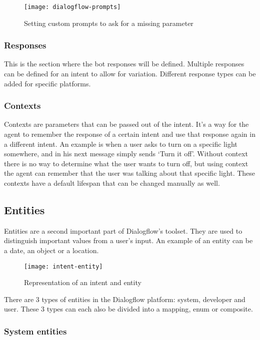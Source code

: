 \begin{figure}[ht]
	\centering
	\texttt{[image: dialogflow-prompts]}
	\caption{Setting custom prompts to ask for a missing parameter}
	\label{fig:dialogflow-prompts}
\end{figure}

\subsubsection{Responses}

This is the section where the bot responses will be defined. Multiple responses can be defined for an intent to allow for variation. Different response types can be added for specific platforms.

\subsubsection{Contexts}

Contexts are parameters that can be passed out of the intent. It's a way for the agent to remember the response of a certain intent and use that response again in a different intent. An example is when a user asks to turn on a specific light somewhere, and in his next message simply sends `Turn it off'. Without context there is no way to determine what the user wants to turn off, but using context the agent can remember that the user was talking about that specific light. These contexts have a default lifespan that can be changed manually as well.

\subsection{Entities}

Entities are a second important part of Dialogflow's toolset. They are used to distinguish important values from a user's input. An example of an entity can be a date, an object or a location.

\begin{figure}[ht]
	\centering
	\texttt{[image: intent-entity]}
	\caption{Representation of an intent and entity}
	\label{fig:intent-entity}
\end{figure}

There are 3 types of entities in the Dialogflow platform: system, developer and user. These 3 types can each also be divided into a \Gls{mapping}, \Gls{enum} or \Gls{composite}.

\subsubsection{System entities}

